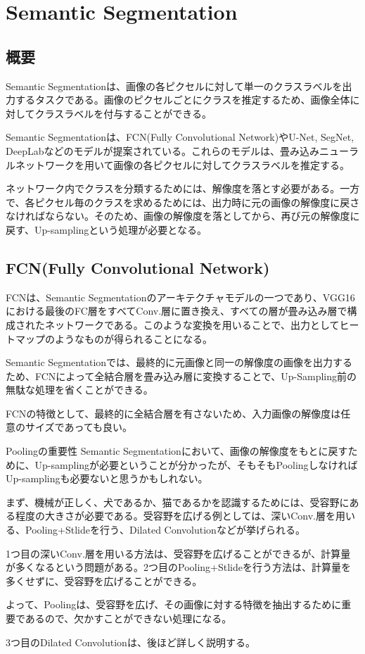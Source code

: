 \documentclass{ltjsarticle}
\begin{document}
\clearpage
\section{Semantic Segmentation}
\subsection{概要}
Semantic Segmentationは、画像の各ピクセルに対して単一のクラスラベルを出力するタスクである。画像のピクセルごとにクラスを推定するため、画像全体に対してクラスラベルを付与することができる。
\par
Semantic Segmentationは、FCN(Fully Convolutional Network)やU-Net, SegNet, DeepLabなどのモデルが提案されている。これらのモデルは、畳み込みニューラルネットワークを用いて画像の各ピクセルに対してクラスラベルを推定する。
\par
ネットワーク内でクラスを分類するためには、解像度を落とす必要がある。一方で、各ピクセル毎のクラスを求めるためには、出力時に元の画像の解像度に戻さなければならない。そのため、画像の解像度を落としてから、再び元の解像度に戻す、Up-samplingという処理が必要となる。

\subsection{FCN(Fully Convolutional Network)}
FCNは、Semantic Segmentationのアーキテクチャモデルの一つであり、VGG16における最後のFC層をすべてConv.層に置き換え、すべての層が畳み込み層で構成されたネットワークである。このような変換を用いることで、出力としてヒートマップのようなものが得られることになる。
\par
Semantic Segmentationでは、最終的に元画像と同一の解像度の画像を出力するため、FCNによって全結合層を畳み込み層に変換することで、Up-Sampling前の無駄な処理を省くことができる。
\par
FCNの特徴として、最終的に全結合層を有さないため、入力画像の解像度は任意のサイズであっても良い。

\begin{itembox}{Poolingの重要性}
  Semantic Segmentationにおいて、画像の解像度をもとに戻すために、Up-samplingが必要ということが分かったが、そもそもPoolingしなければUp-samplingも必要ないと思うかもしれない。
  \par
  まず、機械が正しく、犬であるか、猫であるかを認識するためには、受容野にある程度の大きさが必要である。受容野を広げる例としては、深いConv.層を用いる、Pooling+Stlideを行う、Dilated Convolutionなどが挙げられる。
  \par
  1つ目の深いConv.層を用いる方法は、受容野を広げることができるが、計算量が多くなるという問題がある。2つ目のPooling+Stlideを行う方法は、計算量を多くせずに、受容野を広げることができる。
  \par
  よって、Poolingは、受容野を広げ、その画像に対する特徴を抽出するために重要であるので、欠かすことができない処理になる。
  \par
  3つ目のDilated Convolutionは、後ほど詳しく説明する。
\end{itembox}
\end{document}
